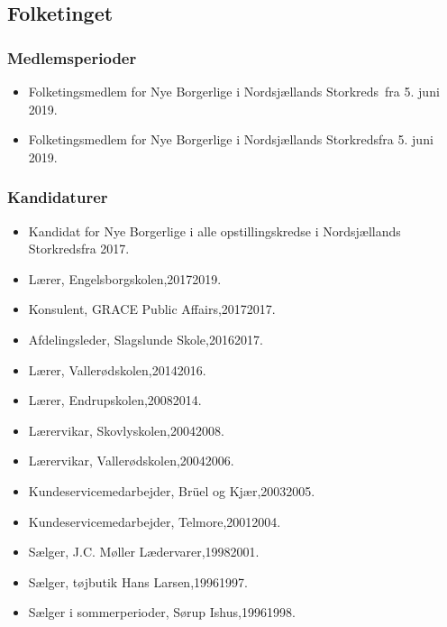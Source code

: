 \documentclass[11pt, a4paper]{awesome-cv}
\begin{document}
\begin{cvletter}
\subsection*{Folketinget}
\subsubsection*{Medlemsperioder}
\begin{itemize}
\item Folketingsmedlem for Nye Borgerlige i Nordsjællands Storkreds fra 5. juni 2019.
\item Folketingsmedlem for Nye Borgerlige i Nordsjællands Storkredsfra 5. juni 2019.
\end{itemize}
\subsubsection*{Kandidaturer}
\begin{itemize}
\item Kandidat for Nye Borgerlige i alle opstillingskredse i Nordsjællands Storkredsfra 2017.
\end{itemize}
\begin{itemize}
\item Lærer, Engelsborgskolen,20172019.
\item Konsulent, GRACE Public Affairs,20172017.
\item Afdelingsleder, Slagslunde Skole,20162017.
\item Lærer, Vallerødskolen,20142016.
\item Lærer, Endrupskolen,20082014.
\item Lærervikar, Skovlyskolen,20042008.
\item Lærervikar, Vallerødskolen,20042006.
\item Kundeservicemedarbejder, Brüel og Kjær,20032005.
\item Kundeservicemedarbejder, Telmore,20012004.
\item Sælger, J.C. Møller Lædervarer,19982001.
\item Sælger, tøjbutik Hans Larsen,19961997.
\item Sælger i sommerperioder, Sørup Ishus,19961998.
\end{itemize}
\end{cvletter}
\end{document}

